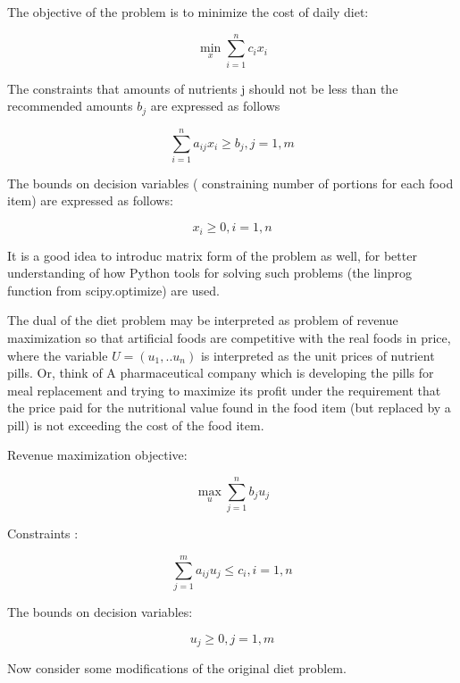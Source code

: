 \documentclass{article} %
\begin{document}
The objective of the problem is to minimize the cost of daily diet:

    \begin{equation}
   \min_x \sum_{i=1}^{n}{c_ix_i}
    \end{equation}

The constraints that amounts of nutrients j should not be less than the recommended amounts $b_j$ are expressed as follows

   \begin{equation}
    \sum_{i=1}^{n}{a_{ij}x_i}\ge b_j, j=1,m
    \end{equation}

The bounds on decision variables ( constraining number of portions for each food item) are expressed as follows:

   \begin{equation}
    x_i\ge 0, i=1,n
    \end{equation}

It is a good idea to introduc matrix form of the problem as well, for better understanding of how  Python tools for solving such problems (the linprog function from scipy.optimize) are used.

The dual of the diet problem may be interpreted as problem of revenue maximization so that artificial foods are competitive with the real foods in price, where the variable $U=(u_1,..u_n )$ is interpreted as the unit prices of nutrient pills. 
Or, think of A pharmaceutical company which is developing the pills for meal replacement and  trying to maximize its profit under the requirement that the price paid for the nutritional value found in the food item (but replaced by a pill) is not exceeding the cost of the food item.

Revenue maximization objective:

    \begin{equation} 
   \max_u \sum_{j=1}^{n}{b_ju_j}
    \end{equation}

Constraints :

   \begin{equation} 
    \sum_{j=1}^{m}{a_{ij}u_j}\le c_i, i=1,n
    \end{equation}

The bounds on decision variables:

   \begin{equation} 
    u_j\ge 0, j=1,m
    \end{equation}


Now consider some modifications of the original diet problem. 
\end{document}
